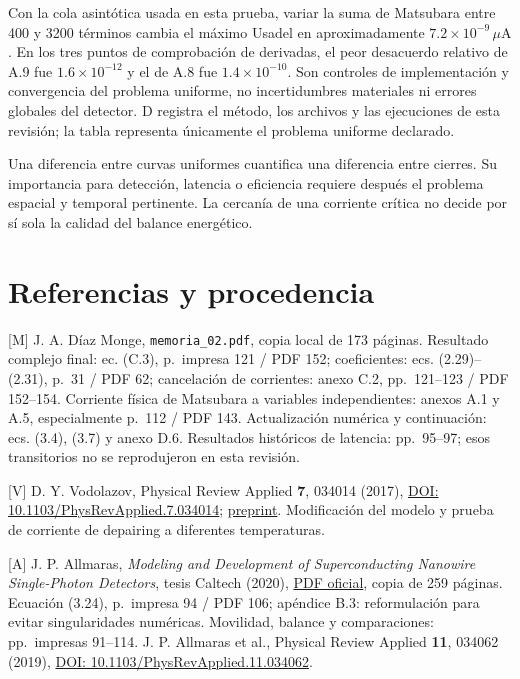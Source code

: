 \documentclass[
  spanish,
  10pt,
  a4paper,
]{article}
\begin{document}
Con la cola asintótica usada en esta prueba, variar la suma de Matsubara
entre 400 y 3200 términos cambia el máximo Usadel en aproximadamente
\(7.2\times10^{-9}\,\mu\mathrm A\). En los tres puntos de comprobación
de derivadas, el peor desacuerdo relativo de A.9 fue
\(1.6\times10^{-12}\) y el de A.8 fue \(1.4\times10^{-10}\). Son
controles de implementación y convergencia del problema uniforme, no
incertidumbres materiales ni errores globales del detector. D registra
el método, los archivos y las ejecuciones de esta revisión; la tabla
representa únicamente el problema uniforme declarado.

Una diferencia entre curvas uniformes cuantifica una diferencia entre
cierres. Su importancia para detección, latencia o eficiencia requiere
después el problema espacial y temporal pertinente. La cercanía de una
corriente crítica no decide por sí sola la calidad del balance
energético.

\section{Referencias y procedencia}\label{referencias-y-procedencia}

{[}M{]} J. A. Díaz Monge, \nolinkurl{memoria_02.pdf}, copia local de 173
páginas. Resultado complejo final: ec. (C.3), p.~impresa 121 / PDF 152;
coeficientes: ecs. (2.29)--(2.31), p.~31 / PDF 62; cancelación de
corrientes: anexo C.2, pp.~121--123 / PDF 152--154. Corriente física de
Matsubara a variables independientes: anexos A.1 y A.5, especialmente
p.~112 / PDF 143. Actualización numérica y continuación: ecs. (3.4),
(3.7) y anexo D.6. Resultados históricos de latencia: pp.~95--97; esos
transitorios no se reprodujeron en esta revisión.

{[}V{]} D. Y. Vodolazov, Physical Review Applied \textbf{7}, 034014
(2017), \href{https://doi.org/10.1103/PhysRevApplied.7.034014}{DOI:
10.1103/PhysRevApplied.7.034014};
\href{https://arxiv.org/abs/1611.06060}{preprint}. Modificación del
modelo y prueba de corriente de depairing a diferentes temperaturas.

{[}A{]} J. P. Allmaras, \emph{Modeling and Development of
Superconducting Nanowire Single-Photon Detectors}, tesis Caltech (2020),
\href{https://thesis.caltech.edu/13748/08/Allmaras_Thesis_Final.pdf}{PDF
oficial}, copia de 259 páginas. Ecuación (3.24), p.~impresa 94 / PDF
106; apéndice B.3: reformulación para evitar singularidades numéricas.
Movilidad, balance y comparaciones: pp.~impresas 91--114. J. P. Allmaras
et al., Physical Review Applied \textbf{11}, 034062 (2019),
\href{https://doi.org/10.1103/PhysRevApplied.11.034062}{DOI:
10.1103/PhysRevApplied.11.034062}.
\end{document}
